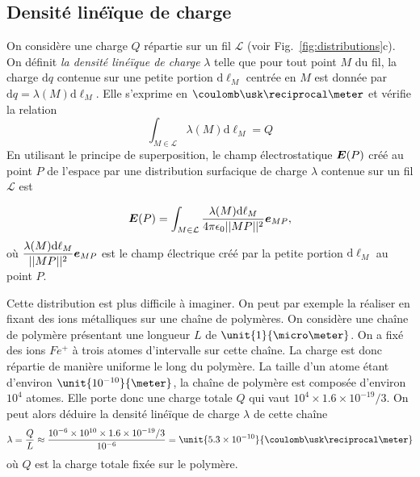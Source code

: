 \subsection{Densité linéïque de charge}
	On considère une charge $Q$ répartie sur un fil $\mathcal{L}$
	(voir Fig.~\ref{fig:distributions}c). 
	On définit \emph{
	la densité linéïque de charge} $\lambda$ 
	telle que pour tout point $M$ du fil,
	la charge $\mathrm{d}q$ contenue sur une petite portion $\mathrm{d}\ell_M$ centrée 
	en $M$ est donnée par $\mathrm{d}q = \lambda(M) \mathrm{d}\ell_M$.
	Elle s'exprime en $\coulomb \usk \reciprocal \meter$ et vérifie la relation
\begin{equation*}
	\int_{M \in \mathcal{L}} \lambda(M) \mathrm{d}\ell_M = Q
\end{equation*}
En utilisant le principe de superposition, le champ électrostatique $\vece(P)$
créé au point $P$ de l'espace par une distribution surfacique de charge $\lambda$
contenue sur un fil $\mathcal{L}$ est

\begin{equation}
	\vece(P) = \int_{M \in \mathcal{L}} 
	\dfrac{\lambda(M) \mathrm{d}\ell_M}{4 \pi \epsilon_0 ||MP||^2}\mitbf{e}_{MP},
\end{equation}
où $\dfrac{\lambda(M) \mathrm{d}\ell_M}{||MP||^2}\mitbf{e}_{MP}$ est le champ 
électrique créé par la petite portion $\mathrm{d}\ell_M$ au point $P$.

\begin{exemple}
	Cette distribution est plus difficile à imaginer.
	On peut par exemple la réaliser en fixant des 
	ions métalliques sur une chaîne de polymères. On considère une chaîne de
	polymère présentant une longueur $L$ de $\unit{1}{\micro \meter}$. On a 
	fixé des ions $Fe^+$ à trois atomes d'intervalle sur cette chaîne.
	La charge est donc répartie de manière uniforme le long du polymère.
	La taille d'un atome étant d'environ $\unit{10^{-10}}{\meter}$, la chaîne de 
	polymère est composée d'environ $10^4$ atomes. Elle porte
	donc une charge totale $Q$ qui vaut $10^4 \times 1.6 \times 10^{-19}/3$.
	On peut alors déduire la
	densité linéïque de charge $\lambda$ de cette chaîne
	\begin{equation}
		\lambda = \dfrac{Q}{L} \approx \dfrac{10^{-6}\times 10^{10}
			           \times 1.6 \times 10^{-19}/3}{10^{-6}}
				= \unit{5.3 \times 10^{-10}}{\coulomb \usk
				   \reciprocal \meter}
	\end{equation}
	où $Q$ est la charge totale fixée sur le polymère.
\end{exemple}

